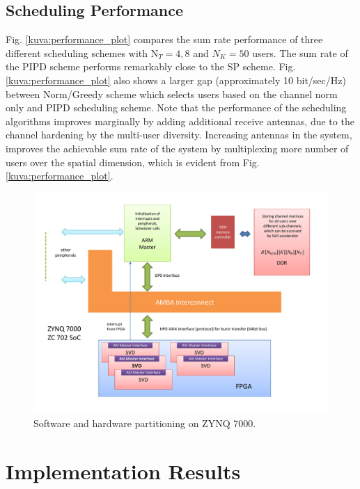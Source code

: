 \documentclass[conference,letterpaper,10pt]{./../../IEEE/IEEEtran}
\begin{document}
\subsection{Scheduling Performance}
Fig. \ref{kuva:performance_plot} compares the sum rate performance of three different scheduling schemes with $\textrm{N}_T = 4,8$ and $N_K = 50$ users. The sum rate of the PIPD scheme performs remarkably close to the SP scheme. Fig. \ref{kuva:performance_plot} also shows a larger gap (approximately 10 bit/sec/Hz) between Norm/Greedy scheme which selects users based on the channel norm only and PIPD scheduling scheme. Note that the performance of the scheduling algorithms improves marginally by adding additional receive antennas, due to the channel hardening by the multi-user diversity. Increasing  antennas in the system, improves the achievable sum rate of the system by multiplexing more number of users over the spatial dimension, which is evident from Fig. \ref{kuva:performance_plot}.
\begin{figure}
	\centering
	\includegraphics[trim=.75in .75in .75in .75in,width=\columnwidth]{blk_diag}
	\caption{Software and hardware partitioning on ZYNQ 7000.}
	\label{kuva:block_diag}
\end{figure}

\section{Implementation Results}
\label{sec:implementation}
\end{document}
